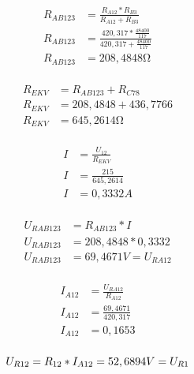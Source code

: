 \documentclass[12pt,a4paper]{article}
\begin{document}
\begin{minipage}{.5\linewidth}
\begin{align*}
        R_{AB123} &= \frac{R_{A12} * R_{B3}}{R_{A12} + R_{B3}} \\[0.5ex]
	R_{AB123} &= \frac{420,317 * \frac{48400}{117}}{420,317 + \frac{48400}{117}} \\[0.5ex]
	R_{AB123} &= 208,4848 \si{\ohm} \\[0.5ex]
\end{align*}
\end{minipage}%
\begin{minipage}{.5\linewidth}
\begin{align*}
        R_{EKV} &= R_{AB123} + R_{C78} \\[0.5ex]
	R_{EKV} &= 208,4848 + 436,7766 \\[0.5ex]
	R_{EKV} &= 645,2614 \si{\ohm} \\[0.5ex]
\end{align*}
\end{minipage}

\begin{minipage}{.33\linewidth}
\begin{align*}
       	I &= \frac{U_{12}}{R_{EKV}} \\[0.5ex]
	I &= \frac{215}{645,2614}\\[0.5ex]
	I &= 0,3332 A \\[0.5ex]
\end{align*}
\end{minipage}%
\begin{minipage}{.33\linewidth}
\begin{align*}
        U_{RAB123} &= R_{AB123} * I \\[0.5ex]
	U_{RAB123} &= 208,4848 * 0,3332 \\[0.5ex]
	U_{RAB123} &= 69,4671 V = U_{RA12}\\[0.5ex]
\end{align*}
\end{minipage}%
\begin{minipage}{.33\linewidth}
\begin{align*}
        I_{A12} &= \frac{U_{RA12}}{R_{A12}} \\[0.5ex]
	I_{A12} &= \frac{69,4671}{420,317} \\[0.5ex]
	I_{A12} &= 0,1653 \\[0.5ex]
\end{align*}
\end{minipage}

\begin{equation}
	U_{R12} = R_{12} * I_{A12} = 52,6894 V = U_{R1} \\
\end{equation}
\end{document}
